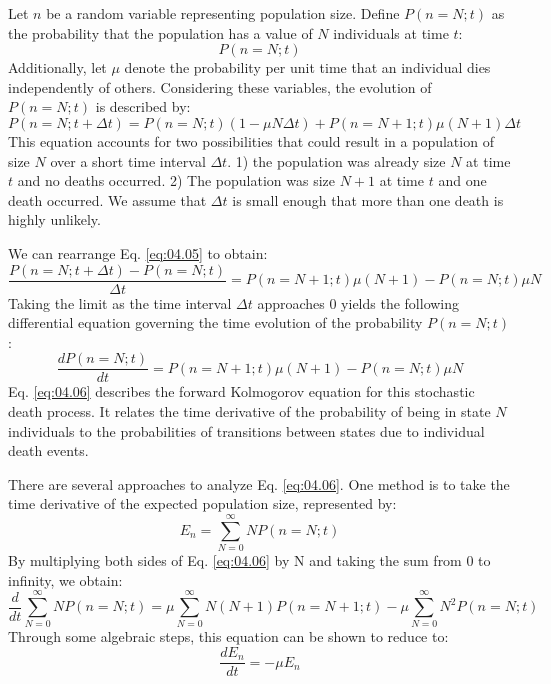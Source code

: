 Let $n$ be a random variable representing population size. Define $P(n=N;t)$ as the probability that the population has a value of $N$ individuals at time $t$:
\begin{equation*}
P(n=N;t)
\end{equation*}
Additionally, let $\mu$ denote the probability per unit time that an individual dies independently of others. Considering these variables, the evolution of $P(n=N;t)$ is described by:
\begin{equation}
P(n=N;t+\Delta t) = P(n=N;t)(1-\mu N\Delta t) + P(n=N+1;t)\mu(N+1)\Delta t \label{eq:04.05}
\end{equation}
This equation accounts for two possibilities that could result in a population of size $N$ over a short time interval $\Delta t$. 1) the population was already size $N$ at time $t$ and no deaths occurred. 2) The population was size $N+1$ at time $t$ and one death occurred. We assume that $\Delta t$ is small enough that more than one death is highly unlikely. 

We can rearrange Eq. \eqref{eq:04.05} to obtain:
\begin{equation*}
\frac{P(n=N;t+\Delta t) - P(n=N;t)}{\Delta t} = P(n=N+1;t)\mu(N+1) - P(n=N;t)\mu N
\end{equation*}
Taking the limit as the time interval $\Delta t$ approaches 0 yields the following differential equation governing the time evolution of the probability $P(n=N;t)$:
\begin{equation}
\frac{d P(n=N;t)}{dt} = P(n=N+1;t)\mu(N+1) - P(n=N;t)\mu N \label{eq:04.06}
\end{equation}
Eq. \eqref{eq:04.06} describes the forward Kolmogorov equation for this stochastic death process. It relates the time derivative of the probability of being in state $N$ individuals to the probabilities of transitions between states due to individual death events.

There are several approaches to analyze Eq. \eqref{eq:04.06}. One method is to take the time derivative of the expected population size, represented by:
\begin{equation*}
E_n = \sum_{N=0}^{\infty} N P(n=N;t)
\end{equation*}
By multiplying both sides of Eq. \eqref{eq:04.06} by N and taking the sum from 0 to infinity, we obtain:
\begin{equation*}
\frac{d}{dt}\sum_{N=0}^{\infty} N P(n=N;t) = \mu \sum_{N=0}^{\infty} N(N+1)P(n=N+1;t) - \mu\sum_{N=0}^{\infty} N^2 P(n=N;t)
\end{equation*}
Through some algebraic steps, this equation can be shown to reduce to:
\begin{equation}
\frac{d E_n}{dt} = - \mu E_n \label{eq:04.07}
\end{equation}

